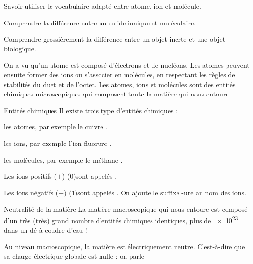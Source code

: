 \teteSndMole
\vspace*{-32pt}

\begin{objectifs}
  \item Savoir utiliser le vocabulaire adapté entre atome, ion et molécule.
  \item Comprendre la différence entre un solide ionique et moléculaire.
  \item Comprendre grossièrement la différence entre un objet inerte et une objet biologique.
\end{objectifs}

\begin{contexte}
  On a vu qu'un atome est composé d'électrons et de nucléons.
  Les atomes peuvent ensuite former des ions ou s'associer en molécules, en respectant les règles de stabilités du duet et de l'octet.
  Les atomes, ions et molécules sont des entités chimiques microscopiques qui composent toute la matière qui nous entoure.

\end{contexte}


\begin{doc}{Entités chimiques}
  Il existe trois type d'entités chimiques :
  \begin{listePoints}
    \item les atomes, par exemple le cuivre .
    \item les ions, par exemple l'ion fluorure .
    \item les molécules, par exemple le méthane .
  \end{listePoints}
  
  \begin{importants}
    Les ions positifs ($+$) \texteTrou(0){sont appelés .}
    
    Les ions négatifs ($-$) \texteTrou(1){sont appelés . On ajoute le suffixe -ure au nom des ions.}
  \end{importants}
\end{doc}

\begin{doc}{Neutralité de la matière}
  La matière macroscopique qui nous entoure est composé d'un très (très) grand nombre d'entités chimiques identiques, plus de \num{e23} dans un dé à coudre d'eau !
  
  \begin{importants}
    Au niveau macroscopique, la matière est électriquement neutre.
    C'est-à-dire que sa charge électrique globale est nulle : on parle 
  \end{importants}
\end{doc}

